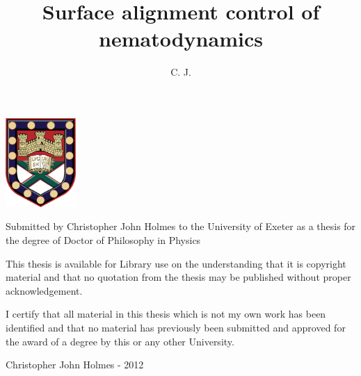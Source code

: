 \documentclass[prb, reprint, superscriptaddress]{revtex4-1}
\begin{document}
\onecolumngrid
\begin{adjustwidth}{1in}{1in}
\begin{center}
\includegraphics[width=0.2\textwidth]{figures/crest}
\end{center}

\vspace{0.5cm}
\small
\noindent Submitted by Christopher John Holmes to the University of Exeter as a thesis for the degree of Doctor of Philosophy in Physics

\vspace{0.5cm}

\noindent This thesis is available for Library use on the understanding that it is copyright material and that no quotation from the thesis may be published without proper acknowledgement.

\vspace{0.5cm}

\noindent I certify that all material in this thesis which is not my own work has been identified and that no material has previously been submitted and approved for the award of a degree by this or any other University.

\vspace{0.5cm}

\noindent Christopher John Holmes - 2012
\end{adjustwidth}


\title{Surface alignment control of nematodynamics}
\author{C. J. }
\end{document}
